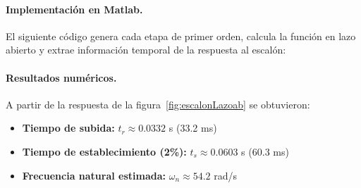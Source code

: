 \paragraph{Implementación en Matlab.}  
El siguiente código genera cada etapa de primer orden, calcula la función en lazo abierto y extrae información temporal de la respuesta al escalón:




\paragraph{Resultados numéricos.}  
A partir de la respuesta de la figura~\ref{fig:escalonLazoab} se obtuvieron:
\begin{itemize}
	\item \textbf{Tiempo de subida:} $t_r \approx 0.0332$ s (33.2 ms)
	\item \textbf{Tiempo de establecimiento (2\%):} $t_s \approx 0.0603$ s (60.3 ms)
	\item \textbf{Frecuencia natural estimada:} $\omega_n \approx 54.2$ rad/s
\end{itemize}




